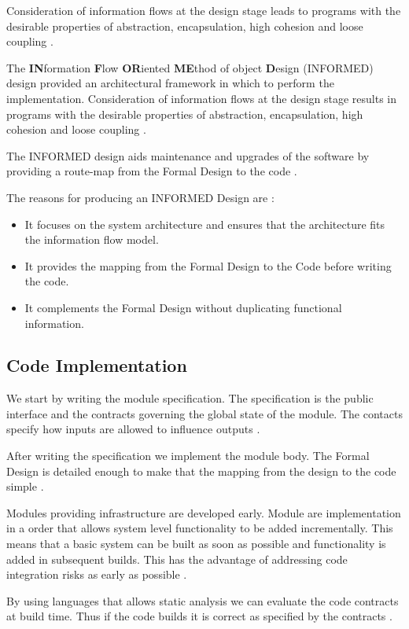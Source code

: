 Consideration of information flows at the design stage leads to programs with the
desirable properties of abstraction, encapsulation, high cohesion and loose 
coupling \parencite{Tokeneer}.

The \textbf{IN}formation \textbf{F}low \textbf{OR}iented \textbf{ME}thod of
object \textbf{D}esign (INFORMED) design provided an architectural framework
in which to perform the implementation. Consideration of information flows at the
design stage results in programs with the desirable properties of abstraction, 
encapsulation, high cohesion and loose coupling \parencite{Tokeneer}.

The INFORMED design aids maintenance and upgrades of the software by providing a
route-map from the Formal Design to the code \parencite{Tokeneer}.

The reasons for producing an INFORMED Design are \parencite{Tokeneer}:
\begin{itemize}
	\item It focuses on the system architecture and ensures that the architecture 
		fits the information flow model.
	\item It provides the mapping from the Formal Design to the Code before writing
		the code.
	\item It complements the Formal Design without duplicating functional information.
\end{itemize}

\subsection{Code Implementation}
We start by writing the module specification. The specification is the public 
interface and the contracts governing the global state of the module. The contacts
specify how inputs are allowed to influence outputs \parencite{Tokeneer}. 

After writing the specification we implement the module body. The Formal Design is
detailed enough to make that the mapping from the design to the code simple 
\parencite{Tokeneer}.

Modules providing infrastructure are developed early. Module are implementation 
in a order that allows system level functionality to be added incrementally. This
means that a basic system can be built as soon as possible and functionality is 
added in subsequent builds. This has the advantage of addressing code integration
risks as early as possible \parencite{Tokeneer}.

By using languages that allows static analysis we can evaluate the code 
contracts at build time. Thus if the code builds it is correct as specified by the
contracts \parencite{Tokeneer}.